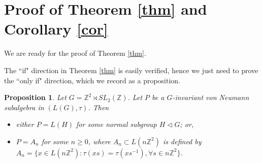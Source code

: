 \documentclass[12pt]{amsart}
\newtheorem{prop}[theorem]{Proposition}
\theoremstyle{definition}
\theoremstyle{remark}
\begin{document}
\section{Proof of Theorem \ref{thm} and Corollary \ref{cor}}\label{section: proof}

We are ready for the proof of Theorem \ref{thm}. 

The ``if" direction in Theorem \ref{thm} is easily verified, hence we just need to prove the ``only if" direction, which we record as a proposition.


\begin{prop}\label{prop: version of thm}
Let $G=\mathbb{Z}^2\rtimes SL_2(\mathbb{Z})$. Let $P$ be a $G$-invariant von Neumann subalgebra in $(L(G),\tau)$. Then 
\begin{itemize}
\item either $P=L(H)$ for some normal subgroup $H\lhd G$; or,
\item $P=A_n$ for some $n\geq 0$, where $A_n\subset L(n\mathbb{Z}^2)$ is defined by $A_n=\{x\in L(n\mathbb{Z}^2): \tau(xs)=\tau(xs^{-1}), \forall s\in n\mathbb{Z}^2\}$.
\end{itemize}
\end{prop}
\end{document}
